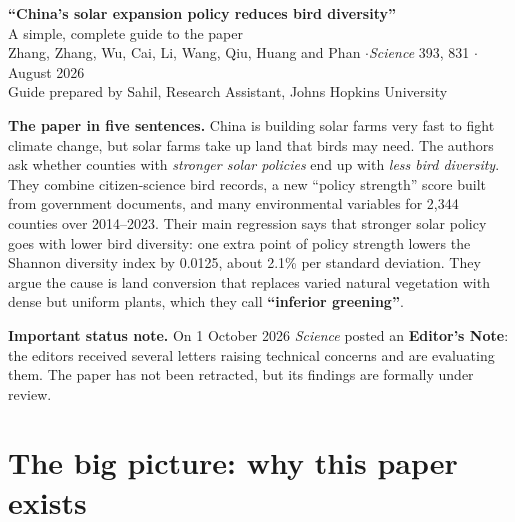 \documentclass[11pt]{article}
\begin{document}
\begin{center}
{\LARGE\bfseries ``China's solar expansion policy reduces bird diversity''}\\[6pt]
{\large A simple, complete guide to the paper}\\[8pt]
{\small Zhang, Zhang, Wu, Cai, Li, Wang, Qiu, Huang and Phan \quad$\cdot$\quad \textit{Science} 393, 831 \quad$\cdot$ August 2026}\\[2pt]
{\small Guide prepared by Sahil, Research Assistant, Johns Hopkins University}
\end{center}

\begin{summarybox}
\small
\textbf{The paper in five sentences.}
China is building solar farms very fast to fight climate change, but solar farms take up land that birds may need. The authors ask whether counties with \emph{stronger solar policies} end up with \emph{less bird diversity}. They combine citizen-science bird records, a new ``policy strength'' score built from government documents, and many environmental variables for 2,344 counties over 2014--2023. Their main regression says that stronger solar policy goes with lower bird diversity: one extra point of policy strength lowers the Shannon diversity index by 0.0125, about 2.1\% per standard deviation. They argue the cause is land conversion that replaces varied natural vegetation with dense but uniform plants, which they call \textbf{``inferior greening''}.
\end{summarybox}

\noindent\textbf{Important status note.} On 1 October 2026 \textit{Science} posted an \textbf{Editor's Note}: the editors received several letters raising technical concerns and are evaluating them. The paper has not been retracted, but its findings are formally under review.

\tableofcontents

\section{The big picture: why this paper exists}
\end{document}
